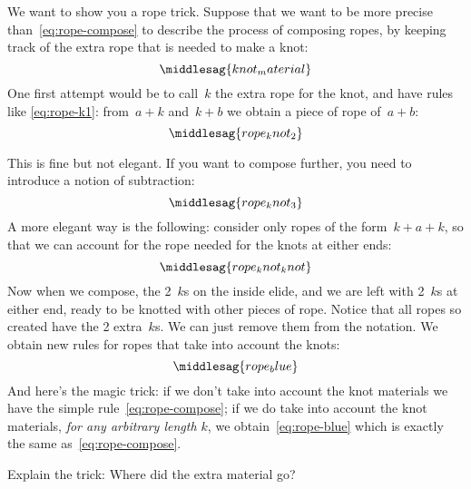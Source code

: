We want to show you a rope trick.
Suppose that we want to be more precise than~\cref{eq:rope-compose} to describe the process of composing ropes, by keeping track of the extra rope that is needed to make a knot:
%
\begin{equation}
    \label{eq:knot_material}
    \middlesag{knot_material}
\end{equation}
%
One first attempt would be to call~$k$ the extra rope for the knot, and have rules like \cref{eq:rope-k1}: from~$a + k$ and~$k + b$ we obtain a piece of rope of~$a+b$:
%
\begin{equation}
    \label{eq:rope-k1}
    \middlesag{rope_knot_2}
\end{equation}

%
%
This is fine but not elegant.
If you want to compose further, you need to introduce a notion of subtraction:
%
\begin{equation}
    \label{eq:rope-k2}
    \middlesag{rope_knot_3}
\end{equation}
%
A more elegant way is the following: consider only ropes of the form~$k + a + k$, so that we can account for the rope needed for the knots at either ends:
%
\begin{equation}
    \label{eq:rope-kk}
    \middlesag{rope_knot_knot}
\end{equation}
%
Now when we compose, the 2~$k$s on the inside elide, and we are left with 2~$k$s at either end, ready to be knotted with other pieces of rope.
Notice that all ropes so created have the 2 extra~$k$s.
We can just remove them from the notation.
We obtain new rules for ropes that take into account the knots:
%
\begin{equation}
    \label{eq:rope-blue}
    \middlesag{rope_blue}
\end{equation}
%
And here's the magic trick: if we don't take into account the knot materials we have the simple rule~\cref{eq:rope-compose}; if we do take into account the knot materials, \emph{for any arbitrary length $k$}, we obtain~\cref{eq:rope-blue} which is exactly the same as~\cref{eq:rope-compose}.
\begin{exercise}
    Explain the trick: Where did the extra material go?
\end{exercise}
